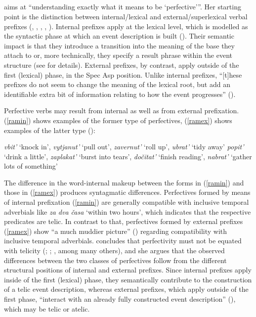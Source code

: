 \documentclass[output=paper,colorlinks,citecolor=brown]{langscibook}
\begin{document}
\subsection{\citet{Ramchand08}} \label{gr}
\citet[1696]{Ramchand08} aims at ``understanding exactly what it means to be `perfective'''. Her starting point is the distinction between internal/lexical and external/superlexical verbal prefixes (\citealt{Ramchand2004}, \citealt{Romanova2004}, \citealt{Svenonius2004}, \citealt{Tatev07}, \citealt{Gehrke2008}). Internal prefixes apply at the lexical level, which is modelled as the syntactic phase at which an event description is built (\citealt[1694]{Ramchand2004}).   
Their semantic impact is that they introduce a transition into the meaning of the base they attach to or, more technically, they specify a result phrase within the event structure (see \citealt{Ramchand2004,Ramchand08} for details). External prefixes, by contrast, apply outside of the first (lexical) phase, in the Spec Asp position. Unlike internal prefixes, ``[t]hese prefixes do not seem to change the meaning of the lexical root, but add an identifiable extra bit of information relating to how the event progresses'' (\citealt[1695]{Ramchand08}).     

Perfective verbs may result from internal as well as from external prefixation. (\ref{ramin}) shows examples of the former type of perfectives, (\ref{ramex}) shows examples of the latter type (\citealt[1692--1695]{Ramchand08}):

\ea\label{ramall}
\ea\label{ramin} \textit{vbit'} `knock in', \textit{vytjanut'} `pull out', \textit{zavernut'} `roll up', \textit{ubrat'} `tidy away'
\ex\label{ramex} \textit{popit'} `drink a little', \textit{zaplakat'} `burst into tears', \textit{dočitat'} `finish reading', \textit{nabrat'} `gather lots of something'
\z\z

\noindent The difference in the word-internal makeup between the forms in (\ref{ramin}) and those in (\ref{ramex}) produces syntagmatic differences. Perfectives formed by means of internal prefixation (\ref{ramin}) are generally compatible with inclusive temporal adverbials like \textit{za dva časa} `within two hours', which indicates that the respective predicates are telic.
In contrast to that, perfectives formed by external prefixes (\ref{ramex}) show ``a much muddier picture'' (\citealt[1697]{Ramchand08}) regarding compatibility with inclusive temporal adverbials. \citet{Ramchand08} concludes that  
perfecti\-vity must not be equated with telicity (\citealt{Filip92,Filip1999}; \citealt{Gehrke2008}; \citealt{Borik2006}, among many others), and she argues that the observed differences between the two classes of perfectives follow from the different structural positions of internal and external prefixes.
Since internal prefixes apply inside of the first (lexical) phase, they semantically contribute to the construction of a telic event description, whereas external prefixes, which apply outside of the first phase, ``interact with an already fully constructed event description'' (\citealt[1696]{Ramchand08}), which may be telic or atelic. 
\end{document}
